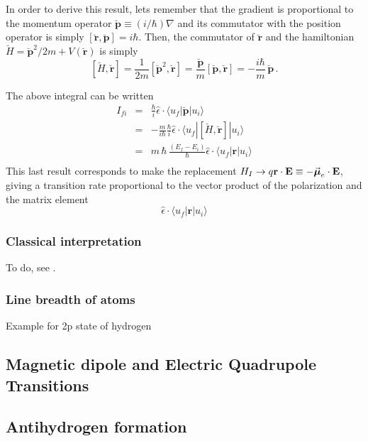 In order to derive this result, lets remember that the gradient is
proportional to the momentum operator $\breve{\bm{p}} \equiv {(i /
\hbar)} \nabla $ and its commutator with the position operator is
simply $ [ \breve{\bm{r}}, \breve{\bm{p}} ] = i \hbar $. Then, the
commutator of $\breve{\bm{r}}$ and the hamiltonian $\breve{H} =
\breve{\bm{p}}^{2}/2 m + V(\breve{\bm{r}})$ is simply
%
\[
[\breve{H},\breve{\bm{r}}] = \frac{1}{2 m} \left[ \breve{\bm{p}}^{2} ,
\breve{\bm{r}} \right] = \frac{\breve{\bm{p}}}{m} [ \breve{\bm{p}} ,
\breve{\bm{r}} ] = - \frac{i \hbar}{m} \, \breve{\bm{p}} \,.
\]

The above integral can be written
\begin{eqnarray*}
I_{fi} &=& \frac{\hbar }{i} \hat{\epsilon}  \cdot \langle u_{f} |
\breve{\bm{p}}| u_{i}\rangle \\
&=& - \frac{m}{i \hbar} \frac{\hbar }{i} \hat{\epsilon} \cdot
\langle
u_{f} | [\breve{H},\breve{\bm{r}}] | u_{i}\rangle \\
&=& m\, \hbar \, \frac{\left(E_{f} - E_{i}\right)}{\hbar}
\hat{\epsilon}
\cdot \langle u_{f} |\bm{r} | u_{i}\rangle \\
\end{eqnarray*}
%
This last result corresponds to make the replacement $H_{I} \to q
\mathbf{r} \cdot \mathbf{E} \equiv - \vec{\boldsymbol{\mu}}_{e} \cdot \mathbf{E}$, giving a
transition rate proportional to the vector product of the polarization
and the matrix element
\[
\hat{\epsilon} \cdot \langle u_{f}|\bm{r}| u_{i}\rangle
\]

\subsubsection{Classical interpretation}

To do, see \citet{Bethe1997AC_IQM}.

\subsubsection{Line breadth of atoms}

Example for 2p state of hydrogen \autocite[see][]{Bethe1997AC_IQM,Townsen2000_AMA}


\subsection{Magnetic dipole and Electric Quadrupole Transitions}



\subsection{Antihydrogen formation}

